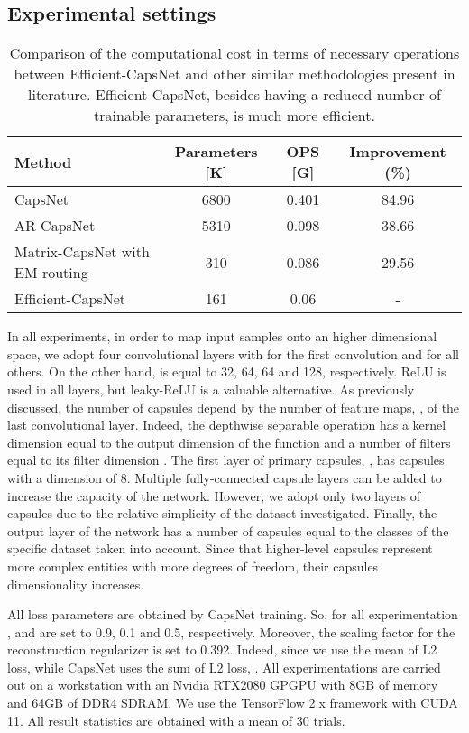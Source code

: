 \documentclass{article}
\begin{document}
\subsection{Experimental settings}
\begin{table}[b]
\centering
\begin{tabular}{lccc}
\toprule
Method                         & Parameters {[}K{]} & OPS {[}G{]} & Improvement (\%) \\ \hline
CapsNet \cite{sabour2017dynamic}        & 6800 &        0.401        & 84.96     \\
AR CapsNet \cite{choi2019attention}     & 5310 &        0.098        & 38.66   \\ 
Matrix-CapsNet with EM routing \cite{hinton2018matrix} & 310  & 0.086               & 29.56                   \\ 
Efficient-CapsNet      & 161 &         0.06                & -                       \\ \bottomrule
\end{tabular}
\caption{Comparison of the computational cost in terms of necessary operations between Efficient-CapsNet and other similar methodologies present in literature. Efficient-CapsNet, besides having a reduced number of trainable parameters, is much more efficient.}
\label{table:computation_cost}
\end{table}
In all experiments, in order to map input samples onto an higher dimensional space, we adopt four convolutional layers with  for the first convolution and  for all others. On the other hand,  is equal to 32, 64, 64 and 128, respectively. ReLU is used in all layers, but leaky-ReLU is a valuable alternative. As previously discussed, the number of capsules depend by the number of feature maps, , of the last convolutional layer. Indeed, the depthwise separable operation has a kernel dimension  equal to the output dimension  of the  function and a number of filters  equal to its filter dimension . The first layer of primary capsules, , has  capsules with a dimension  of 8.
Multiple fully-connected capsule layers can be added to increase the capacity of the network. However, we adopt only two layers of capsules due to the relative simplicity of the dataset investigated. Finally, the output layer of the network has a number of capsules  equal to the classes of the specific dataset taken into account. Since that higher-level capsules represent more complex entities with more degrees of freedom, their capsules dimensionality increases. 

All loss parameters are obtained by CapsNet \cite{sabour2017dynamic} training. So, for all experimentation ,  and  are set to 0.9, 0.1 and 0.5, respectively. Moreover, the scaling factor  for the reconstruction regularizer is set to 0.392. Indeed, since we use the mean of L2 loss, while CapsNet uses the sum of L2 loss, . All experimentations are carried out on a workstation with an Nvidia RTX2080 GPGPU with 8GB of memory and 64GB of DDR4 SDRAM. We use the TensorFlow 2.x framework with CUDA 11. All result statistics are obtained with a mean of 30 trials.
 
\end{document}

